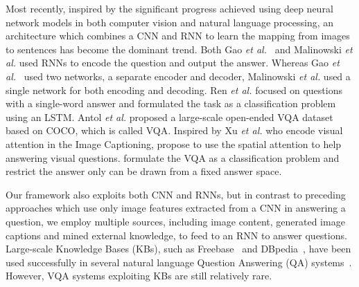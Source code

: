 \documentclass[10pt,journal,compsoc]{IEEEtran}
\newcommand{\etal}{\emph{et al.}}
\begin{document}
Most recently, inspired by the significant progress achieved using deep neural network models in both computer vision and natural language processing, an architecture which combines a CNN and RNN to learn the mapping from images to sentences has become the dominant trend. Both Gao \etal~\cite{gao2015you} and Malinowski \etal \cite{malinowski2015ask} used RNNs to encode the question and output the answer.  Whereas Gao \etal~\cite{gao2015you} used two networks, a separate encoder and decoder, Malinowski \etal \cite{malinowski2015ask} used a single network for both encoding and decoding. Ren \etal \cite{ren2015image} focused on questions with a single-word answer and formulated the task as a classification problem using an LSTM. Antol \etal \cite{antol2015vqa} proposed a large-scale open-ended VQA dataset based on COCO, which is called VQA. Inspired by Xu \etal \cite{xu2015show} who encode visual attention in the Image Captioning, \cite{zhu2015visual7w,xu2015ask,Chen2015ABC,Jiang2015compositional,andreas2015deep,yang2015stacked} propose to use the spatial attention to help answering visual questions. \cite{xu2015ask, yang2015stacked, Noh2015image}
formulate the VQA as a classification problem and restrict the answer only can be drawn from a fixed answer space. 

Our framework also exploits both CNN and RNNs, but in contrast to preceding approaches which use only image features extracted from a CNN in answering a question, we employ multiple sources, including image content, generated image captions and mined external knowledge, to feed to an RNN to answer questions. Large-scale Knowledge Bases (KBs), such as Freebase~\cite{bollacker2008freebase} and DBpedia~\cite{auer2007dbpedia}, have been used successfully in several natural language Question Answering (QA) systems~\cite{berant2013semantic,ferrucci2010building}. However, VQA systems exploiting KBs are still relatively rare.
\end{document}
